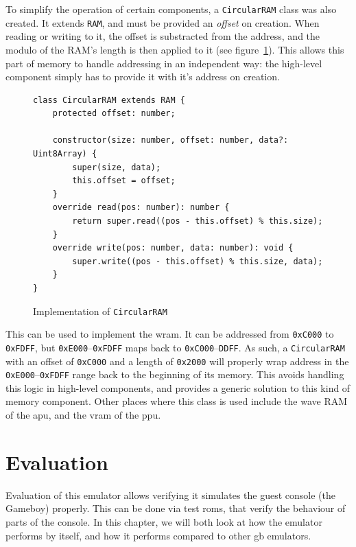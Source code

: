 \documentclass[11pt]{informatics-report}
\begin{document}
To simplify the operation of certain components, a \texttt{CircularRAM} class was also created. It extends \texttt{RAM}, and must be provided an \textit{offset} on creation. When reading or writing to it, the offset is substracted from the address, and the modulo of the RAM's length is then applied to it (see figure~\ref{fig:circular-ram}). This allows this part of memory to handle addressing in an independent way: the high-level component simply has to provide it with it's address on creation.

\begin{figure}[h]
    \begin{verbatim}
class CircularRAM extends RAM {
    protected offset: number;

    constructor(size: number, offset: number, data?: Uint8Array) {
        super(size, data);
        this.offset = offset;
    }
    override read(pos: number): number {
        return super.read((pos - this.offset) % this.size);
    }
    override write(pos: number, data: number): void {
        super.write((pos - this.offset) % this.size, data);
    }
}
    \end{verbatim}
    \caption{Implementation of \texttt{CircularRAM}}
    \label{fig:circular-ram}
\end{figure}

This can be used to implement the \gls{wram}. It can be addressed from \texttt{0xC000} to \texttt{0xFDFF}, but \texttt{0xE000}--\texttt{0xFDFF} maps back to \texttt{0xC000}--\texttt{DDFF}. As such, a \texttt{CircularRAM} with an offset of \texttt{0xC000} and a length of \texttt{0x2000} will properly wrap address in the \texttt{0xE000}--\texttt{0xFDFF} range back to the beginning of its memory. This avoids handling this logic in high-level components, and provides a generic solution to this kind of memory component. Other places where this class is used include the wave RAM of the \gls{apu}, and the \gls{vram} of the \gls{ppu}.

\chapter{Evaluation}

Evaluation of this emulator allows verifying it simulates the guest console (the Gameboy) properly. This can be done via test \glspl{rom}, that verify the behaviour of parts of the console. In this chapter, we will both look at how the emulator performs by itself, and how it performs compared to other \gls{gb} emulators.
\end{document}
